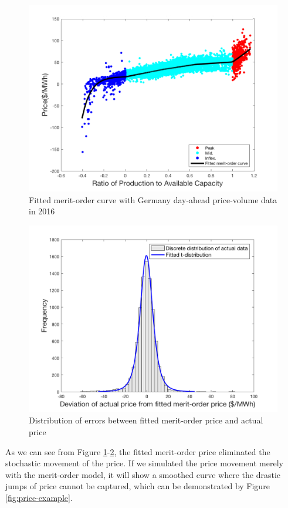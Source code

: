 \begin{figure}[h!]
	\centering
	\includegraphics[width=0.95\linewidth]{Figures/Merit-order-fitted}
	\caption{Fitted merit-order curve with Germany day-ahead price-volume data in 2016}
	\label{fig:merit-fitted}
\end{figure}

\begin{figure}[h!]
	\centering
	\includegraphics[width=0.95\linewidth]{Figures/4_Error-distribution}
	\caption{Distribution of errors between fitted merit-order price and actual price}
	\label{fig:merit-error}
\end{figure}

As we can see from Figure \ref{fig:merit-fitted}-\ref{fig:merit-error}, the fitted merit-order price eliminated the stochastic movement of the price. If we simulated the price movement merely with the merit-order model, it will show a smoothed curve where the drastic jumps of price cannot be captured, which can be demonstrated by Figure \ref{fig:price-example}.

